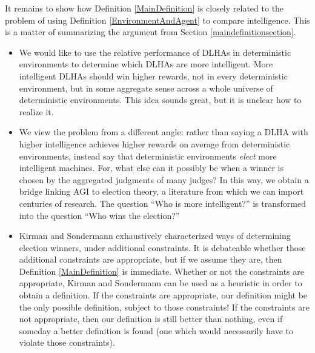 \documentclass[twoside,11pt]{article}
\begin{document}
It remains to show how Definition \ref{MainDefinition} is closely related to
the problem of using Definition \ref{EnvironmentAndAgent} to compare intelligence.
This is a matter of summarizing the argument from Section \ref{maindefinitionsection}.
\begin{itemize}
    \item
    We would like to use the relative performance of DLHAs in deterministic environments
    to determine which DLHAs are more intelligent. More intelligent DLHAs should
    win higher rewards, not in every deterministic environment, but in some aggregate
    sense across a whole universe of
    deterministic environments. This idea sounds great, but
    it is unclear how to realize it.
    \item
    We view the problem from a different angle: rather
    than saying a DLHA with higher intelligence achieves higher rewards
    on average from deterministic environments, instead say that deterministic
    environments \emph{elect} more intelligent machines. For, what else can it
    possibly be when a winner is chosen by the aggregated judgments of many
    judges? In this way, we obtain a bridge linking AGI to election theory, a literature
    from which we can import centuries of research.
    The question ``Who is more intelligent?'' is transformed into the
    question ``Who wins the election?''
    \item
    Kirman and Sondermann exhaustively characterized ways of determining election
    winners, under additional constraints. It is debateable whether those
    additional constraints are appropriate, but if we assume they are,
    then Definition \ref{MainDefinition} is immediate. Whether or not the constraints
    are appropriate, Kirman and Sondermann can be used as a heuristic in order to
    obtain a definition. If the constraints are appropriate, our definition might be
    the only possible definition, subject to those constraints!
    If the constraints are not appropriate, then our definition is still better than
    nothing, even if someday a better definition is found (one which would necessarily
    have to violate those constraints).
\end{itemize}

\end{document}
